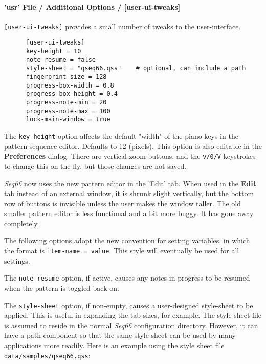 \paragraph{'usr' File / Additional Options / [user-ui-tweaks]}
\label{paragraph:user_file_added_options_tweaks}

   \texttt{[user-ui-tweaks]} provides a small number of tweaks to the
   user-interface.

   \begin{verbatim}
      [user-ui-tweaks]
      key-height = 10
      note-resume = false
      style-sheet = "qseq66.qss"    # optional, can include a path
      fingerprint-size = 128
      progress-box-width = 0.8
      progress-box-height = 0.4
      progress-note-min = 20
      progress-note-max = 100
      lock-main-window = true
   \end{verbatim}

   The \texttt{key-height} option
   affects the default "width" of the piano keys in the pattern
   sequence editor.  Defaults to 12 (pixels).
   This option is also editable in the \textbf{Preferences} dialog.
   There are vertical zoom buttons, and the \texttt{v/0/V} keystrokes to change
   this on the fly, but those changes are not saved.

   \textsl{Seq66} now uses the new pattern editor in the 'Edit' tab.
   When used in the \textbf{Edit} tab instead of an external window,
   it is shrunk slight vertically, but the bottom row of buttons is invisible
   unless the user makes the window taller.
   The old smaller pattern editor is less functional and a bit more buggy.
   It has gone away completely.

   The following options adopt the new convention for setting variables, in
   which the format is \texttt{item-name = value}.
   This style will eventually be used for all settings.

   The \texttt{note-resume} option, if active, causes any notes in progress
   to be resumed when the pattern is toggled back on.

   The \texttt{style-sheet} option, if non-empty, causes a user-designed
   style-sheet to be applied.  This is useful in expanding the tab-sizes, for
   example.
   The style sheet file is assumed to reside in the normal \textsl{Seq66}
   configuration directory.
   However, it can have a path component so that the same style sheet
   can be used by many applications more readily.
   Here is an example using the style sheet file
   \texttt{data/samples/qseq66.qss}:

